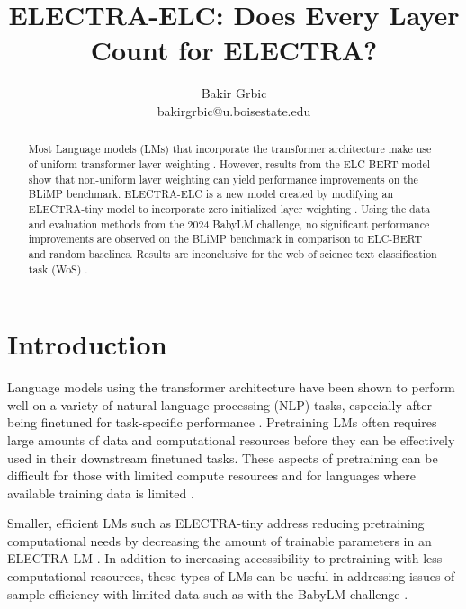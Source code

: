 \documentclass[11pt]{article}
\title{ELECTRA-ELC: Does Every Layer Count for ELECTRA?}
\author{Bakir Grbic \\ bakirgrbic@u.boisestate.edu}
\begin{document}
\maketitle

\begin{abstract}
Most Language models (LMs) that incorporate the transformer architecture \cite{Vaswani2017-kv} make use of uniform transformer layer weighting 
\cite{charpentier2023layersequallyimportantlayer}. However, results from the ELC-BERT model 
\cite{charpentier2023layersequallyimportantlayer} show that non-uniform layer weighting can
yield performance improvements on the BLiMP 
\cite{warstadt2023blimpbenchmarklinguisticminimal} benchmark. ELECTRA-ELC is a new model
created by modifying an ELECTRA-tiny model \cite{fields-kennington-2023-exploring} to 
incorporate zero initialized layer weighting 
\cite{charpentier2023layersequallyimportantlayer}. Using the data and evaluation methods 
from the 2024 BabyLM challenge, no significant performance improvements are observed on the 
BLiMP benchmark in comparison to ELC-BERT and random baselines. Results are inconclusive for the web of science text classification task (WoS)  \cite{kowsari2017HDLTex}.

\end{abstract}


\section{Introduction}

Language models using the transformer architecture \cite{Vaswani2017-kv}
have been shown to perform well on a variety of natural language processing (NLP)
tasks, especially after being finetuned for task-specific performance \cite{devlin2019bertpretrainingdeepbidirectional}. Pretraining LMs often
requires large amounts of data and computational resources before they can be effectively used in their downstream finetuned tasks. These aspects of pretraining can be 
difficult for those with limited compute resources \cite{fields-kennington-2023-exploring} 
and for languages where available training data is limited
\cite{samuel2025smalllanguagesbigmodels}. 

Smaller, efficient LMs such as ELECTRA-tiny \cite{fields-kennington-2023-exploring} 
address reducing pretraining computational needs
by decreasing the amount of trainable parameters in an ELECTRA LM
\cite{clark2020electrapretrainingtextencoders}. In addition to increasing accessibility to 
pretraining with less computational resources, these types of LMs can be useful in addressing
issues of sample efficiency with limited data such as with the BabyLM challenge
\cite{charpentier2025babylmturns3papers}.
\end{document}
